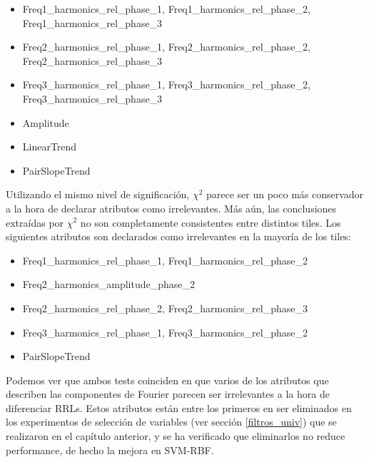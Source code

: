 \begin{itemize}
\item Freq1\_harmonics\_rel\_phase\_1, Freq1\_harmonics\_rel\_phase\_2, Freq1\_harmonics\_rel\_phase\_3 

\item Freq2\_harmonics\_rel\_phase\_1, Freq2\_harmonics\_rel\_phase\_2, Freq2\_harmonics\_rel\_phase\_3

\item Freq3\_harmonics\_rel\_phase\_1, Freq3\_harmonics\_rel\_phase\_2, Freq3\_harmonics\_rel\_phase\_3
\item Amplitude
\item LinearTrend
\item PairSlopeTrend
\end{itemize}


Utilizando el mismo nivel de significación, $\chi^2$ parece ser un poco más conservador a la hora de declarar atributos como irrelevantes. Más aún, las conclusiones extraídas por $\chi^2$ no son completamente consistentes entre distintos tiles. Los siguientes atributos son declarados como irrelevantes en la mayoría de los tiles:

\begin{itemize}
\item Freq1\_harmonics\_rel\_phase\_1, Freq1\_harmonics\_rel\_phase\_2
\item Freq2\_harmonics\_amplitude\_phase\_2
\item Freq2\_harmonics\_rel\_phase\_2, Freq2\_harmonics\_rel\_phase\_3
\item Freq3\_harmonics\_rel\_phase\_1, Freq3\_harmonics\_rel\_phase\_2
\item PairSlopeTrend
\end{itemize}

Podemos ver que ambos tests coinciden en que varios de los atributos que describen las componentes de Fourier parecen ser irrelevantes a la hora de diferenciar RRLs. Estos atributos están entre los primeros en ser eliminados en los experimentos de selección de variables (ver sección \ref{filtros_univ}) que se realizaron en el capítulo anterior, y se ha verificado que eliminarlos no reduce performance, de hecho la mejora en SVM-RBF. \\

